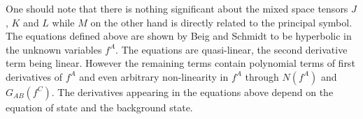 \hfuzz=1pt %
One should note that there is nothing significant about the mixed space tensors $J$, $K$ and $L$ while $M$ on the other hand is directly related to the principal symbol. The equations defined above are shown by Beig and Schmidt to be hyperbolic in the unknown variables $f^A$. The equations are quasi-linear, the second derivative term being linear. However the remaining terms contain polynomial terms of first derivatives of $f^A$ and even arbitrary non-linearity in $f^A$ through $N(f^A)$ and $G_{AB}(f^C)$. The derivatives appearing in the equations above depend on the equation of state and the background state.
